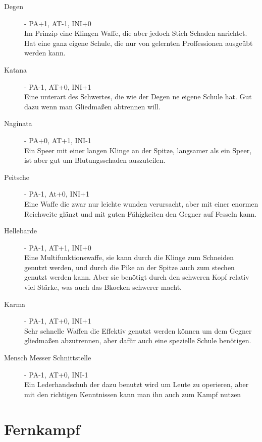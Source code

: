 \documentclass[a4paper,12pt,oneside]{book}
\begin{document}
\begin{description}
\item[Degen] - PA+1, AT-1, INI+0
\\Im Prinzip eine Klingen Waffe, die aber jedoch Stich Schaden anrichtet. Hat eine ganz eigene Schule, die nur von gelernten Proffessionen ausgeübt werden kann.
\item[Katana] - PA-1, AT+0, INI+1
\\Eine unterart des Schwertes, die wie der Degen ne eigene Schule hat. Gut dazu wenn man Gliedmaßen abtrennen will.
\item[Naginata] - PA+0, AT+1, INI-1
\\Ein Speer mit einer langen Klinge an der Spitze, langsamer als ein Speer, ist aber gut um Blutungsschaden auszuteilen.
\item[Peitsche] - PA-1, At+0, INI+1
\\Eine Waffe die zwar nur leichte wunden verursacht, aber mit einer enormen Reichweite glänzt und mit guten Fähigkeiten den Gegner auf Fesseln kann.
\item[Hellebarde] - PA-1, AT+1, INI+0
\\Eine Multifunktionswaffe, sie kann durch die Klinge zum Schneiden genutzt werden, und durch die Pike an der Spitze auch zum stechen genutzt werden kann. Aber sie benötigt durch den schweren Kopf relativ viel Stärke, was auch das Bkocken schwerer macht.
\item[Karma] - PA-1, AT+0, INI+1 
\\Sehr schnelle Waffen die Effektiv genutzt werden können um dem Gegner gliedmaßen abzutrennen, aber dafür auch eine spezielle Schule benötigen.
\item[Mensch Messer Schnittstelle] - PA-1, AT+0, INI-1
\\Ein Lederhandschuh der dazu benutzt wird um Leute zu operieren, aber mit den richtigen Kenntnissen kann man ihn auch zum Kampf nutzen
\end {description}

\chapter{Fernkampf}
\end{document}
